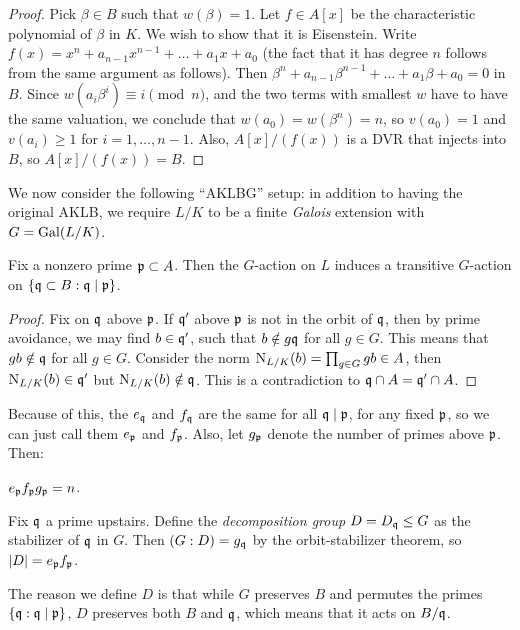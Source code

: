 \documentclass[11pt]{amsart}
\begin{document}
\begin{proof}
Pick $\beta\in B$ such that $w(\beta) = 1$. Let $f \in A[x]$ be the characteristic polynomial of $\beta$ in $K$. We wish to show that it is Eisenstein. Write $f(x) = x^n + a_{n-1}x^{n-1} + \dots + a_1x + a_0$ (the fact that it has degree $n$ follows from the same argument as follows). Then $\beta^n + a_{n-1}\beta^{n-1} + \dots + a_1\beta + a_0 = 0$ in $B$. Since $w(a_i\beta^i) \equiv i \pmod{n}$, and the two terms with smallest $w$ have to have the same valuation, we conclude that $w(a_0) = w(\beta^n) = n$, so $v(a_0) = 1$ and $v(a_i) \ge 1$ for $i = 1,\dots,n-1$. Also, $A[x]/(f(x))$ is a DVR that injects into $B$, so $A[x]/(f(x)) = B$.
\end{proof}

We now consider the following ``AKLBG'' setup: in addition to having the original AKLB, we require $L/K$ to be a finite \emph{Galois} extension with $G = \operatorname{Gal}(L/K)$.

\begin{prop}
Fix a nonzero prime $\mathfrak{p}\subset A$. Then the $G$-action on $L$ induces a transitive $G$-action on $\{\mathfrak{q} \subset B: \mathfrak{q}\mid\mathfrak{p}\}$.
\end{prop}

\begin{proof}
Fix on $\mathfrak{q}$ above $\mathfrak{p}$. If $\mathfrak{q}'$ above $\mathfrak{p}$ is not in the orbit of $\mathfrak{q}$, then by prime avoidance, we may find $b\in \mathfrak{q}'$, such that $b\notin g\mathfrak{q}$ for all $g\in G$. This means that $gb \notin \mathfrak{q}$ for all $g\in G$. Consider the norm $\operatorname{N}_{L/K}(b) = \prod_{g\in G} gb \in A$, then $\operatorname{N}_{L/K}(b)\in \mathfrak{q}'$ but $\operatorname{N}_{L/K}(b) \notin \mathfrak{q}$. This is a contradiction to $\mathfrak{q}\cap A = \mathfrak{q}'\cap A$.
\end{proof}

Because of this, the $e_{\mathfrak{q}}$ and $f_{\mathfrak{q}}$ are the same for all $\mathfrak{q}\mid \mathfrak{p}$, for any fixed $\mathfrak{p}$, so we can just call them $e_{\mathfrak{p}}$ and $f_{\mathfrak{p}}$. Also, let $g_{\mathfrak{p}}$ denote the number of primes above $\mathfrak{p}$. Then:

\begin{prop}
$e_{\mathfrak{p}}f_{\mathfrak{p}}g_{\mathfrak{p}} = n$.
\end{prop}

Fix $\mathfrak{q}$ a prime upstairs. Define the \emph{decomposition group} $D = D_{\mathfrak{q}} \le G$ as the stabilizer of $\mathfrak{q}$ in $G$. Then $(G:D) = g_{\mathfrak{q}}$ by the orbit-stabilizer theorem, so $|D| = e_{\mathfrak{p}}f_{\mathfrak{p}}$.

The reason we define $D$ is that while $G$ preserves $B$ and permutes the primes $\{\mathfrak{q}: \mathfrak{q}\mid \mathfrak{p}\}$, $D$ preserves both $B$ and $\mathfrak{q}$, which means that it acts on $B/\mathfrak{q}$. 
\end{document}
